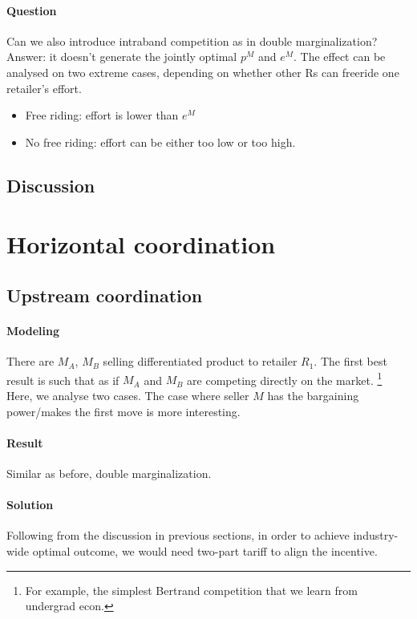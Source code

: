 \paragraph{Question} Can we also introduce intraband competition as in double marginalization? Answer: it doesn't generate the jointly optimal $p^M$ and $e^M$. The effect can be analysed on two extreme cases, depending on whether other Rs can freeride one retailer's effort.
\begin{itemize}
    \item Free riding: effort is lower than $e^M$
    \item No free riding: effort can be either too low or too high. 
\end{itemize}
\subsection{Discussion}


\section{Horizontal coordination}

\subsection{Upstream coordination}
\paragraph{Modeling}
There are $M_A$, $M_B$ selling differentiated product to retailer $R_1$.
The first best result is such that as if $M_A$ and $M_B$ are competing directly on the market. \footnote{For example, the simplest Bertrand competition that we learn from undergrad econ.} Here, we analyse two cases. The case where seller $M$ has the bargaining power/makes the first move is more interesting. 
\paragraph{Result} Similar as before, double marginalization.
\paragraph{Solution} Following from the discussion in previous sections, in order to achieve industry-wide optimal outcome, we would need two-part tariff to align the incentive. 
